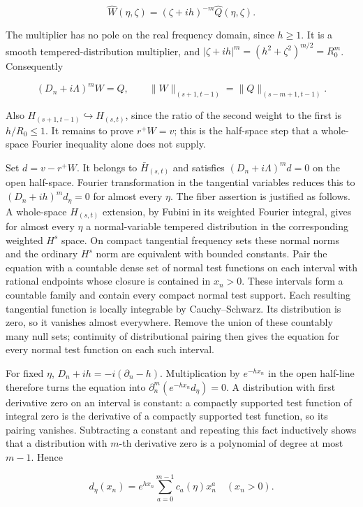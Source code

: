 \documentclass[
  11pt,
]{article}
\begin{document}
\[
 \widehat W(\eta,\zeta)
       =(\zeta+ih)^{-m}\widehat Q(\eta,\zeta).
 \tag{MSB54}
\]

The multiplier has no pole on the real frequency domain, since
\(h\geq1\). It is a smooth tempered-distribution multiplier, and
\(|\zeta+ih|^m=(h^2+\zeta^2)^{m/2}=R_0^m\). Consequently

\[
 (D_n+i\Lambda)^mW=Q,\qquad
 \|W\|_{(s+1,t-1)}=\|Q\|_{(s-m+1,t-1)}.
 \tag{MSB55}
\]

Also \(H_{(s+1,t-1)}\hookrightarrow H_{(s,t)}\), since the ratio of the
second weight to the first is \(h/R_0\leq1\). It remains to prove
\(r^+W=v\); this is the half-space step that a whole-space Fourier
inequality alone does not supply.

Set \(d=v-r^+W\). It belongs to \(\bar H_{(s,t)}\) and satisfies
\((D_n+i\Lambda)^md=0\) on the open half-space. Fourier transformation
in the tangential variables reduces this to \((D_n+ih)^md_\eta=0\) for
almost every \(\eta\). The fiber assertion is justified as follows. A
whole-space \(H_{(s,t)}\) extension, by Fubini in its weighted Fourier
integral, gives for almost every \(\eta\) a normal-variable tempered
distribution in the corresponding weighted \(H^s\) space. On compact
tangential frequency sets these normal norms and the ordinary \(H^s\)
norm are equivalent with bounded constants. Pair the equation with a
countable dense set of normal test functions on each interval with
rational endpoints whose closure is contained in \(x_n>0\). These
intervals form a countable family and contain every compact normal test
support. Each resulting tangential function is locally integrable by
Cauchy--Schwarz. Its distribution is zero, so it vanishes almost
everywhere. Remove the union of these countably many null sets;
continuity of distributional pairing then gives the equation for every
normal test function on each such interval.

For fixed \(\eta\), \(D_n+ih=-i(\partial_n-h)\). Multiplication by
\(e^{-hx_n}\) in the open half-line therefore turns the equation into
\(\partial_n^m(e^{-hx_n}d_\eta)=0\). A distribution with first
derivative zero on an interval is constant: a compactly supported test
function of integral zero is the derivative of a compactly supported
test function, so its pairing vanishes. Subtracting a constant and
repeating this fact inductively shows that a distribution with \(m\)-th
derivative zero is a polynomial of degree at most \(m-1\). Hence

\[
 d_\eta(x_n)=e^{hx_n}\sum_{a=0}^{m-1}c_a(\eta)x_n^a
          \quad(x_n>0).
 \tag{MSB56}
\]
\end{document}
